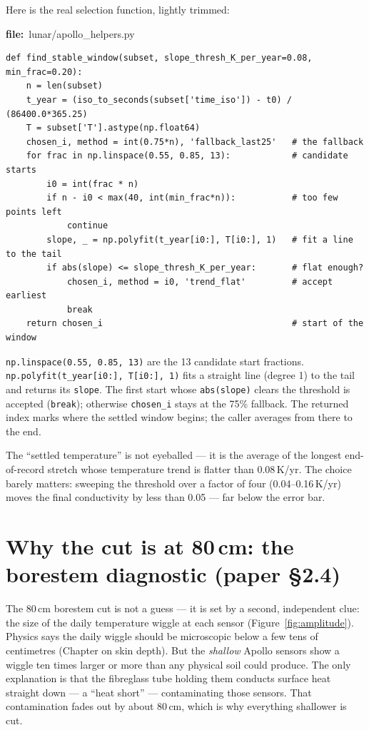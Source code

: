 \documentclass[11pt]{article}
\newcommand{\codefile}[1]{\par\smallskip\noindent
  {\footnotesize\ttfamily\color{teal!55!black}\textbf{file:}~#1}\par\nopagebreak}
\renewcommand{\codefile}[1]{\par\smallskip\noindent
    {\footnotesize\ttfamily\color{black}\textbf{file:}~#1}\par\nopagebreak}
\begin{document}
Here is the real selection function, lightly trimmed:
\codefile{lunar/apollo\_helpers.py}
\begin{lstlisting}
def find_stable_window(subset, slope_thresh_K_per_year=0.08, min_frac=0.20):
    n = len(subset)
    t_year = (iso_to_seconds(subset['time_iso']) - t0) / (86400.0*365.25)
    T = subset['T'].astype(np.float64)
    chosen_i, method = int(0.75*n), 'fallback_last25'   # the fallback
    for frac in np.linspace(0.55, 0.85, 13):            # candidate starts
        i0 = int(frac * n)
        if n - i0 < max(40, int(min_frac*n)):           # too few points left
            continue
        slope, _ = np.polyfit(t_year[i0:], T[i0:], 1)   # fit a line to the tail
        if abs(slope) <= slope_thresh_K_per_year:       # flat enough?
            chosen_i, method = i0, 'trend_flat'         # accept earliest
            break
    return chosen_i                                     # start of the window
\end{lstlisting}
\begin{codebox}
\texttt{np.linspace(0.55, 0.85, 13)} are the 13 candidate start fractions.
\texttt{np.polyfit(t\_year[i0:], T[i0:], 1)} fits a straight line (degree
1) to the tail and returns its \texttt{slope}. The first start whose
\texttt{abs(slope)} clears the threshold is accepted (\texttt{break});
otherwise \texttt{chosen\_i} stays at the 75\% fallback. The returned
index marks where the settled window begins; the caller averages from
there to the end.
\end{codebox}

\begin{keybox}
The ``settled temperature'' is not eyeballed --- it is the average of the
longest end-of-record stretch whose temperature trend is flatter than
0.08\,K/yr. The choice barely matters: sweeping the threshold over a
factor of four (0.04--0.16\,K/yr) moves the final conductivity by less
than 0.05 --- far below the error bar.
\end{keybox}

\section{Why the cut is at 80\,cm: the borestem diagnostic (paper \S2.4)}
The 80\,cm borestem cut is not a guess --- it is set by a second,
independent clue: the size of the daily temperature wiggle at each sensor
(Figure~\ref{fig:amplitude}). Physics says the daily wiggle should be
microscopic below a few tens of centimetres (Chapter on skin depth). But
the \emph{shallow} Apollo sensors show a wiggle ten times larger or more
than any physical soil could produce. The only explanation is that the
fibreglass tube holding them conducts surface heat straight down ---
a ``heat short'' --- contaminating those sensors. That contamination
fades out by about 80\,cm, which is why everything shallower is cut.
\end{document}
